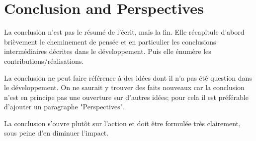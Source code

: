 
\chapter{Conclusion and Perspectives} %

\label{Chapter6} %

La conclusion n'est pas le résumé de l'écrit,  mais la fin. Elle récapitule d'abord brièvement le cheminement de pensée et en particulier les conclusions intermédiaires décrites dans le développement. Puis elle énumère les contributions/réalisations.

La conclusion ne peut faire référence à des idées dont il n'a pas été question dans le développement. On ne saurait y trouver des faits nouveaux car la conclusion n'est en principe pas une ouverture sur d'autres idées; pour cela il est préférable d'ajouter un paragraphe "Perspectives".

La conclusion s'ouvre plutôt sur l'action et doit être formulée très clairement, sous peine d'en diminuer l'impact.
